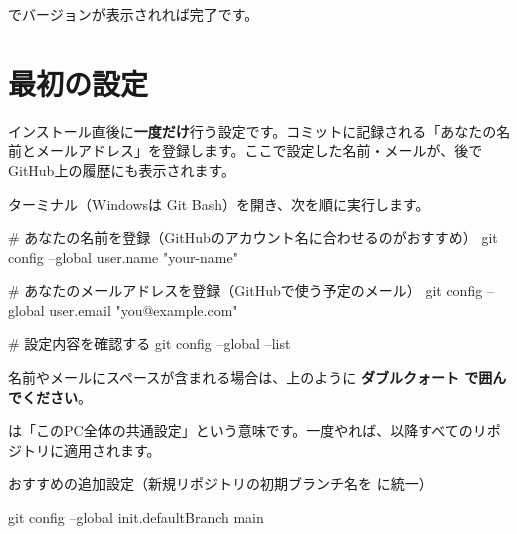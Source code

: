  でバージョンが表示されれば完了です。

\section{最初の設定}
\label{sec:first-config}

インストール直後に\textbf{一度だけ}行う設定です。コミットに記録される「あなたの名前とメールアドレス」を登録します。ここで設定した名前・メールが、後でGitHub上の履歴にも表示されます。

ターミナル（Windowsは Git Bash）を開き、次を順に実行します。

\begin{codebox}[bash]
\begin{code}
# あなたの名前を登録（GitHubのアカウント名に合わせるのがおすすめ）
git config --global user.name "your-name"

# あなたのメールアドレスを登録（GitHubで使う予定のメール）
git config --global user.email "you@example.com"

# 設定内容を確認する
git config --global --list
\end{code}
\end{codebox}

\begin{warnbox}
名前やメールにスペースが含まれる場合は、上のように \textbf{ダブルクォート  で囲んでください}。
\end{warnbox}

 は「このPC全体の共通設定」という意味です。一度やれば、以降すべてのリポジトリに適用されます。

\begin{hintbox}
おすすめの追加設定（新規リポジトリの初期ブランチ名を  に統一）
\begin{codebox}[bash]
\begin{code}
git config --global init.defaultBranch main
\end{code}
\end{codebox}
\end{hintbox}

